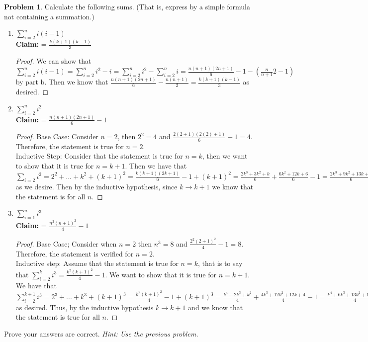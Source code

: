 \documentclass[11pt, letter]{amsart}
\theoremstyle{definition}
\newtheorem{problem}{Problem}[]
\begin{document}
\clearpage
\begin{problem}
  Calculate the following sums.  (That is, express by a simple formula not containing a summation.)
  \begin{enumerate}[label=(\alph*)]
  \item $\sum_{i=2}^n i(i - 1)$\\
  \textbf{Claim:} = $\frac{k(k + 1)(k - 1)}{3}$
  \begin{proof}
  We can show that $\sum_{i = 2}^ni(i-1) = \sum_{i = 2}^ni^2-i = \sum_{i = 2}^ni^2 - \sum_{i = 2}^n i = \frac{n(n + 1)(2n + 1)}{6} - 1 - (\frac{n}{n + 1}{2} - 1)$ by part b. Then we know that $\frac{n(n + 1)(2n + 1)}{6} - \frac{n(n + 1)}{2} = \frac{k(k + 1)(k - 1)}{3}$ as desired.
  \end{proof}
  \item $\sum_{i=2}^n i^2$\\
  \textbf{Claim:} = $\frac{n (n + 1) (2 n + 1)}{6} - 1$
  \begin{proof}
  Base Case: Consider $n = 2$, then $2^2 = 4$ and $\frac{2 (2 + 1) (2 (2) + 1)}{6}  - 1= 4.$ Therefore, the statement is true for $n = 2.$\\
  Inductive Step: Consider that the statement is true for $n = k$, then we want to show that it is true for $n = k + 1.$ Then we have that $\sum_{i = 2} i^2 = 2^2 + ... + k^2 + (k + 1)^2 = \frac{k (k + 1)(2k + 1)}{6} - 1 + (k + 1)^2 = \frac{2k^3 + 3k^2 + k}{6} + \frac{6k^2 + 12k + 6}{6} - 1 = \frac{2k^3 + 9k^2 + 13k + 6}{6} - 1 = \frac{(k + 1)((k + 1) + 1)(2(k + 1) + 1)}{6} - 1$ as we desire. Then by the inductive hypothesis, since $k \rightarrow k + 1$ we know that the statement is for all $n$.
  \end{proof}
  \item $\sum_{i=1}^n i^3$\\
  \textbf{Claim:} = $\frac{n^2(n + 1)^2}{4} - 1$
  \begin{proof}
  Base Case; Consider when $n = 2$ then $n^3 = 8$ and $\frac{2^2(2 + 1)^2}{4} - 1 = 8$. Therefore, the statement is verified for $n = 2.$\\
  Inductive step: Assume that the statement is true for $n = k$, that is to say that $\sum_{i = 2}^ki^3 = \frac{k^2(k + 1)^2}{4} - 1$. We want to show that it is true for $n = k + 1.$ We have that $\sum_{i = 2}^{k + 1}i^3 = 2^3 + ... + k^3 + (k + 1)^3 = \frac{k^2(k + 1)^2}{4} - 1 + (k + 1)^3 = \frac{k^4 + 2k^3 + k^2}{4} + \frac{4k^3 + 12k^2 + 12k + 4}{4} - 1 = \frac{k^4 + 6k^3 + 13k^2 + 12k + 4}{4} - 1 = \frac{(k + 1)^2 ((k + 1) + 1)^2}{4} - 1$ as desired. Thus, by the inductive hypothesis $k \rightarrow k + 1$ and we know that the statement is true for all $n$.
  \end{proof}
  \end{enumerate}
  Prove your answers are correct.
  \textit{Hint: Use the previous problem.}
\end{problem}
\end{document}
